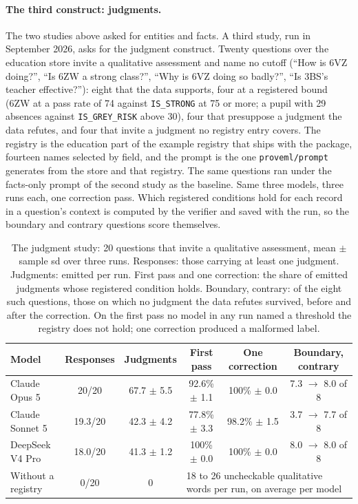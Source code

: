 \documentclass[11pt,a4paper]{article}
\begin{document}
\paragraph{The third construct: judgments.} The two studies above asked for entities and facts. A third study, run in September 2026, asks for the judgment construct. Twenty questions over the education store invite a qualitative assessment and name no cutoff (``How is 6VZ doing?'', ``Is 6ZW a strong class?'', ``Why is 6VZ doing so badly?'', ``Is 3BS's teacher effective?''): eight that the data supports, four at a registered bound (6ZW at a pass rate of 74 against \texttt{IS\_STRONG} at 75 or more; a pupil with 29 absences against \texttt{IS\_GREY\_RISK} above 30), four that presuppose a judgment the data refutes, and four that invite a judgment no registry entry covers. The registry is the education part of the example registry that ships with the package, fourteen names selected by field, and the prompt is the one \texttt{proveml/prompt} generates from the store and that registry. The same questions ran under the facts-only prompt of the second study as the baseline. Same three models, three runs each, one correction pass. Which registered conditions hold for each record in a question's context is computed by the verifier and saved with the run, so the boundary and contrary questions score themselves.

\begin{table}[h]
\centering
\small
\setlength{\tabcolsep}{3pt}
\footnotesize
\begin{tabular}{lccccc}
\toprule
\textbf{Model} & \textbf{Responses} & \textbf{Judgments} & \textbf{First pass} & \textbf{One correction} & \textbf{Boundary, contrary} \\
\midrule
Claude Opus 5 & 20/20 & 67.7 $\pm$ 5.5 & 92.6\% $\pm$ 1.1 & 100\% $\pm$ 0.0 & 7.3 $\to$ 8.0 of 8 \\
Claude Sonnet 5 & 19.3/20 & 42.3 $\pm$ 4.2 & 77.8\% $\pm$ 3.3 & 98.2\% $\pm$ 1.5 & 3.7 $\to$ 7.7 of 8 \\
DeepSeek V4 Pro & 18.0/20 & 41.3 $\pm$ 1.2 & 100\% $\pm$ 0.0 & 100\% $\pm$ 0.0 & 8.0 $\to$ 8.0 of 8 \\
\midrule
Without a registry & 0/20 & 0 & \multicolumn{3}{l}{18 to 26 uncheckable qualitative words per run, on average per model} \\
\bottomrule
\end{tabular}
\caption{The judgment study: 20 questions that invite a qualitative assessment, mean $\pm$ sample sd over three runs. Responses: those carrying at least one judgment. Judgments: emitted per run. First pass and one correction: the share of emitted judgments whose registered condition holds. Boundary, contrary: of the eight such questions, those on which no judgment the data refutes survived, before and after the correction. On the first pass no model in any run named a threshold the registry does not hold; one correction produced a malformed label.}
\label{tab:judgment}
\end{table}
\end{document}
